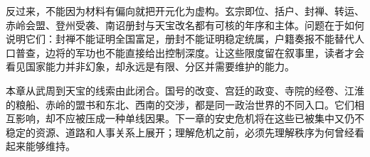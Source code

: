 反过来，不能因为材料有偏向就把开元化为虚构。玄宗即位、括户、封禅、转运、赤岭会盟、登州受袭、南诏册封与天宝改名都有可核的年序和主体。问题在于如何说明它们：封禅不能证明全国富足，册封不能证明稳定统属，户籍奏报不能替代人口普查，边将的军功也不能直接给出控制深度。让这些限度留在叙事里，读者才会看见国家能力并非幻象，却永远是有限、分区并需要维护的能力。

本章从武周到天宝的线索由此闭合。国号的改变、宫廷的政变、寺院的经卷、江淮的粮船、赤岭的盟书和东北、西南的交涉，都是同一政治世界的不同入口。它们相互影响，却不应被压成一种单线因果。下一章的安史危机将在这些已被集中又仍不稳定的资源、道路和人事关系上展开；理解危机之前，必须先理解秩序为何曾经看起来能够维持。
